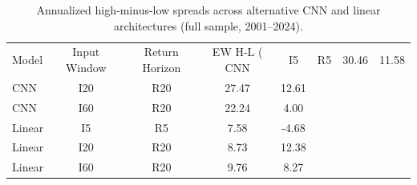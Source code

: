\begin{table}[ht]
\centering
\caption{Annualized high-minus-low spreads across alternative CNN and linear architectures (full sample, 2001–2024).}
\label{tab:architecture_robustness}
\begin{tabular}{lcccc}
\toprule
Model & Input Window & Return Horizon & EW H-L (%
\midrule
CNN & I5 & R5 & 30.46 & 11.58 \\
CNN & I20 & R20 & 27.47 & 12.61 \\
CNN & I60 & R20 & 22.24 & 4.00 \\
Linear & I5 & R5 & 7.58 & -4.68 \\
Linear & I20 & R20 & 8.73 & 12.38 \\
Linear & I60 & R20 & 9.76 & 8.27 \\
\bottomrule
\end{tabular}
\end{table}
